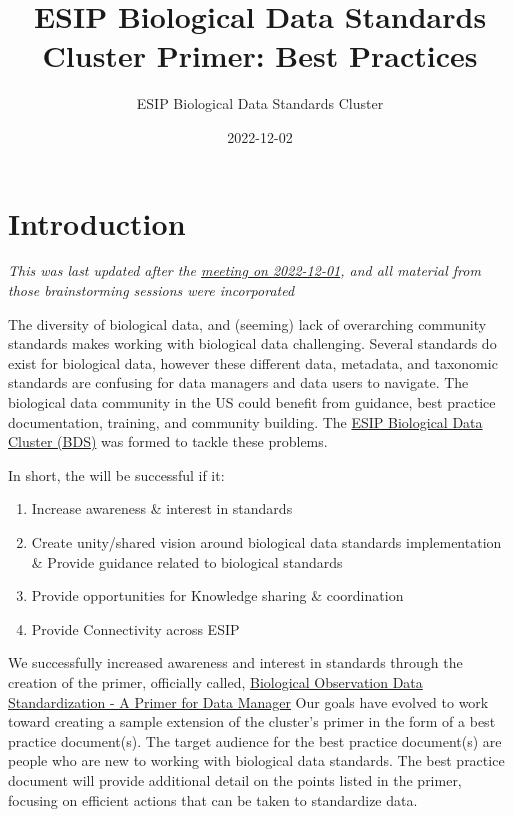 \documentclass[
  oneside]{book}
\title{ESIP Biological Data Standards Cluster Primer: Best Practices}
\author{ESIP Biological Data Standards Cluster}
\date{2022-12-02}
\providecommand{\tightlist}{%
  \setlength{\itemsep}{0pt}\setlength{\parskip}{0pt}}
\begin{document}
\maketitle

{
\hypersetup{linkcolor=}
\setcounter{tocdepth}{1}
\tableofcontents
}
\hypertarget{introduction}{%
\chapter{Introduction}\label{introduction}}

\emph{This was last updated after the \href{https://docs.google.com/document/d/1cBQEy_-MNYm8SBN-0iY_X2esd6MSM-pZE_MZD6rv0Do/edit\#}{meeting on 2022-12-01}, and all material from those brainstorming sessions were incorporated}

The diversity of biological data, and (seeming) lack of overarching community standards makes working with biological data challenging. Several standards do exist for biological data, however these different data, metadata, and taxonomic standards are confusing for data managers and data users to navigate. The biological data community in the US could benefit from guidance, best practice documentation, training, and community building. The \href{https://wiki.esipfed.org/Biological_Data_Standards_Cluster}{ESIP Biological Data Cluster (BDS)} was formed to tackle these problems.

In short, the will be successful if it:

\begin{enumerate}
\def\labelenumi{\arabic{enumi}.}
\tightlist
\item
  Increase awareness \& interest in standards
\item
  Create unity/shared vision around biological data standards implementation \& Provide guidance related to biological standards
\item
  Provide opportunities for Knowledge sharing \& coordination
\item
  Provide Connectivity across ESIP
\end{enumerate}

We successfully increased awareness and interest in standards through the creation of the primer, officially called, \href{https://doi.org/10.6084/m9.figshare.16806712.v1}{Biological Observation Data Standardization - A Primer for Data Manager} Our goals have evolved to work toward creating a sample extension of the cluster's primer in the form of a best practice document(s). The target audience for the best practice document(s) are people who are new to working with biological data standards. The best practice document will provide additional detail on the points listed in the primer, focusing on efficient actions that can be taken to standardize data.
\end{document}
